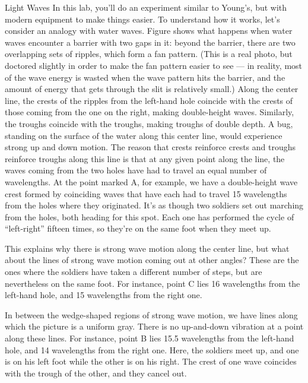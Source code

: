 \begin{lab}{Light Waves}
In this lab, you'll do an experiment similar to Young's, but with
modern equipment to make things easier. To understand how it works,
let's consider an analogy with water waves. Figure  shows
what happens when water waves encounter a barrier with two gaps in it:
beyond the barrier, there are two overlapping sets of ripples,
which form a fan pattern. (This is a real photo, but doctored slightly
in order to make the fan pattern easier to see --- in reality, most of the
wave energy is wasted when the wave pattern hits the barrier, and the amount
of energy that gets through the slit is relatively small.)
Along the center line, the crests of the ripples from the left-hand
hole coincide with the crests of those coming from the one on the right,
making double-height waves. Similarly, the troughs coincide with the troughs,
making troughs of double depth. A bug, standing on the surface of the water 
along this center line, would experience strong up and down motion. The reason
that crests reinforce crests and troughs reinforce troughs along this line is that
at any given point along the line, the waves coming from the two holes have had
to travel an equal number of wavelengths. At the point marked A,
for example, we have a double-height wave crest formed by coinciding waves that have
each had to travel 15 wavelengths from the holes where they originated. It's as though
two soldiers set out marching from the holes, both heading for this spot. Each one has performed
the cycle of ``left-right'' fifteen times, so they're on the same foot when they meet up.

This explains why there is strong wave motion along the center line, but what about
the lines of strong wave motion coming out at other angles? These are the ones
where the soldiers have taken a different number of steps, but are nevertheless on
the same foot. For instance, point C 
lies 16 wavelengths from the left-hand hole, and 15 wavelengths from the right one.

In between the wedge-shaped regions of strong wave motion, we have lines along which the
picture is a uniform gray. There is no up-and-down vibration at a point along these lines.
For instance, point B
lies 15.5 wavelengths from the left-hand hole, and 14 wavelengths from the right one.
Here, the soldiers meet up, and one is on his left foot while the other is on his right.
The crest of one wave coincides with the trough of the other, and they cancel out.


\end{lab}
